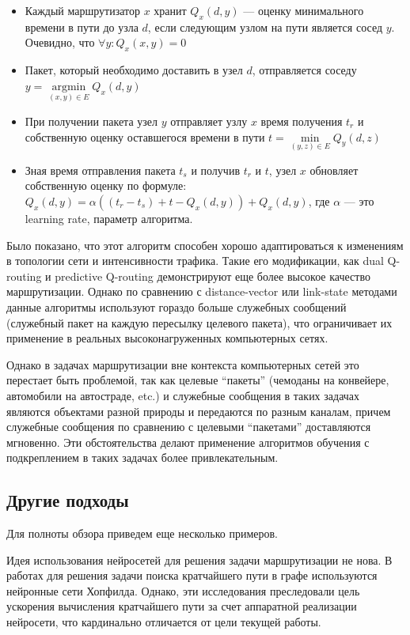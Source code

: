 \documentclass[]{itmo-student-thesis}
\DeclareMathOperator{\argmin}{argmin}
\begin{document}
\begin{itemize}
\item Каждый маршрутизатор $x$ хранит $Q_x(d, y)$ --- оценку минимального
  времени в пути до узла $d$, если следующим узлом на пути является сосед $y$.
  Очевидно, что $\forall y : Q_x(x, y) = 0$ 
\item Пакет, который необходимо доставить в узел $d$, отправляется соседу
  $y = \argmin\limits_{(x, y) \in E} Q_x(d, y)$
\item При получении пакета узел $y$ отправляет узлу $x$ время получения $t_r$ и
  собственную оценку оставшегося времени в пути
  $t = \min\limits_{(y, z) \in E} Q_y(d, z)$
\item Зная время отправления пакета $t_s$ и получив $t_r$ и $t$, узел $x$
  обновляет собственную оценку по формуле:
  $Q_x(d, y) = \alpha((t_r - t_s) + t - Q_x(d, y)) + Q_x(d, y)$,
  где $\alpha$ --- это learning rate, параметр алгоритма.
\end{itemize}

Было показано, что этот алгоритм способен хорошо адаптироваться к изменениям в
топологии сети и интенсивности трафика. Такие его модификации, как dual
Q-routing\cite{dual-q-routing} и predictive Q-routing\cite{predictive-q-routing}
демонстрируют еще более высокое качество маршрутизации. Однако по сравнению с
distance-vector или link-state методами данные алгоритмы используют гораздо
больше служебных сообщений (служебный пакет на каждую пересылку целевого
пакета), что ограничивает их применение в реальных высоконагруженных
компьютерных сетях.

Однако в задачах маршрутизации вне контекста компьютерных сетей это перестает
быть проблемой, так как целевые ``пакеты'' (чемоданы на конвейере, автомобили на
автостраде, etc.) и служебные сообщения в таких задачах являются объектами разной природы и
передаются по разным каналам, причем служебные сообщения по сравнению с целевыми
``пакетами'' доставляются мгновенно. Эти обстоятельства делают применение
алгоритмов обучения с подкреплением в таких задачах более привлекательным.

\subsection{Другие подходы}

Для полноты обзора приведем еще несколько примеров.

Идея использования нейросетей для решения задачи маршрутизации не нова. В
работах \cite{ali-nn-routing, araujo2001neural} для решения задачи поиска кратчайшего пути в графе
используются нейронные сети Хопфилда. Однако, эти исследования преследовали цель
ускорения вычисления кратчайшего пути за счет аппаратной реализации нейросети,
что кардинально отличается от цели текущей работы.
\end{document}
